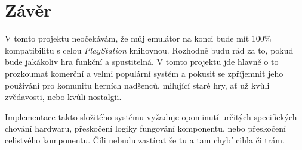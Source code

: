 \chapter{Závěr}

V tomto projektu neočekávám, že můj emulátor na konci bude mít 100\% kompatibilitu s celou \textit{PlayStation} knihovnou.
Rozhodně budu rád za to, pokud bude jakákoliv hra funkční a spustitelná. V tomto projektu jde hlavně o to prozkoumat
komerční a velmi populární systém a pokusit se zpříjemnit jeho používání pro komunitu herních nadšenců, milující staré hry, 
ať už kvůli zvědavosti, nebo kvůli nostalgii.

Implementace takto složitého systému vyžaduje opominutí určitých specifických chování hardwaru, přeskočení logiky fungování
komponentu, nebo přeskočení celistvého komponentu. Čili nebudu zastírat že tu a tam chybí cihla či trám.

